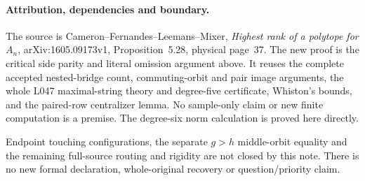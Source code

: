 \documentclass[11pt,a4paper]{article}
\begin{document}
\paragraph{Attribution, dependencies and boundary.}
The source is Cameron--Fernandes--Leemans--Mixer, \emph{Highest
rank of a polytope for $A_n$}, arXiv:1605.09173v1,
Proposition~5.28, physical page~37. The new proof is the critical
side parity and literal omission argument above. It reuses the
complete accepted nested-bridge count, commuting-orbit and pair
image arguments, the whole L047 maximal-string theory and degree-five
certificate, Whiston's bounds, and the paired-row centralizer lemma.
No sample-only claim or new finite computation is a premise.
The degree-six norm calculation is proved here directly.

Endpoint touching configurations, the separate $g>h$ middle-orbit
equality and the remaining full-source routing and rigidity are
not closed by this note. There is no new formal declaration,
whole-original recovery or question/priority claim.
\end{document}
